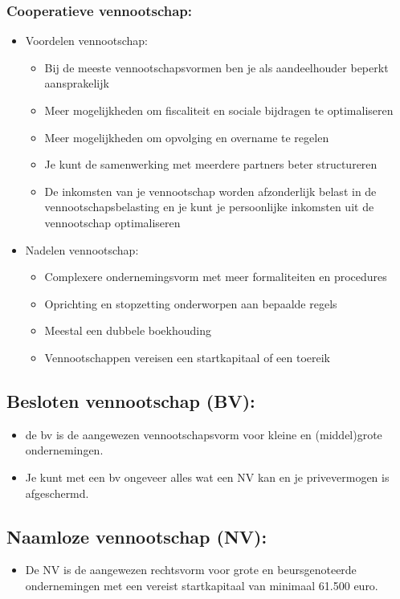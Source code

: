 \documentclass[12pt]{article}
\begin{document}
\subsubsection{Cooperatieve vennootschap:}
\begin{itemize}
    \item Voordelen vennootschap:\begin{itemize}
        \item Bij de meeste vennootschapsvormen ben je als aandeelhouder beperkt aansprakelijk
        \item Meer mogelijkheden om fiscaliteit en sociale bijdragen te optimaliseren
        \item Meer mogelijkheden om opvolging en overname te regelen
        \item Je kunt de samenwerking met meerdere partners beter structureren
        \item De inkomsten van je vennootschap worden afzonderlijk belast in de vennootschapsbelasting en je kunt je
        persoonlijke inkomsten uit de vennootschap optimaliseren
    \end{itemize}
    \item Nadelen vennootschap:\begin{itemize}
        \item Complexere ondernemingsvorm met meer formaliteiten en procedures
        \item Oprichting en stopzetting onderworpen aan bepaalde regels
        \item Meestal een dubbele boekhouding
        \item Vennootschappen vereisen een startkapitaal of een toereik
    \end{itemize}
\end{itemize}
\subsection{Besloten vennootschap (BV):}
\begin{itemize}
    \item de bv is de aangewezen vennootschapsvorm voor kleine en (middel)grote ondernemingen.
    \item Je kunt met een bv ongeveer alles wat een NV kan en je privevermogen is afgeschermd.
\end{itemize}
\subsection{Naamloze vennootschap (NV):}
\begin{itemize}
    \item De NV is de aangewezen rechtsvorm voor grote en beursgenoteerde ondernemingen met een vereist startkapitaal van minimaal 61.500 euro.
\end{itemize}
\end{document}
